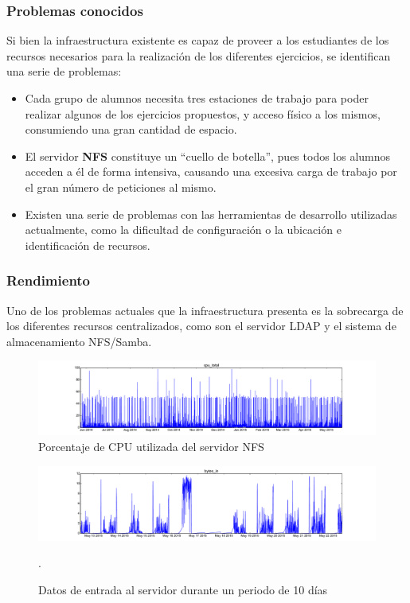 \subsubsection{Problemas conocidos}

Si bien la infraestructura existente es capaz de proveer a los estudiantes de los recursos necesarios para la realización de los diferentes ejercicios, se identifican una serie de problemas:

\begin{itemize}
  \item Cada grupo de alumnos necesita tres estaciones de trabajo para poder realizar algunos de los ejercicios propuestos, y acceso físico a los mismos, consumiendo una gran cantidad de espacio.
  \item El servidor \textbf{NFS} constituye un ``cuello de botella'', pues todos los alumnos acceden a él de forma intensiva, causando una excesiva carga de trabajo por el gran número de peticiones al mismo.
  \item Existen una serie de problemas con las herramientas de desarrollo utilizadas actualmente, como la dificultad de configuración o la ubicación e identificación de recursos.
\end{itemize}

\subsubsection{Rendimiento}
\label{dominio:estadisticas}
Uno de los problemas actuales que la infraestructura presenta es la sobrecarga de los diferentes recursos centralizados, como son el servidor LDAP y el sistema de almacenamiento NFS/Samba.

\begin{figure}[H]
\centering
\includegraphics[width=\textwidth]{Chapters/Chapter4/Figures/data/cpu_total-2014-05-23_21:27:50-2015-05-22_13:41:46}
\caption{Porcentaje de CPU utilizada del servidor NFS}
\end{figure}

\begin{figure}[H]
\centering
\includegraphics[width=\textwidth]{Chapters/Chapter4/Figures/data/bytes_in-2015-05-12_11:56:26-2015-05-22_12:51:08}
\caption{Datos de entrada al servidor durante un periodo de 10 días}.
\end{figure}

